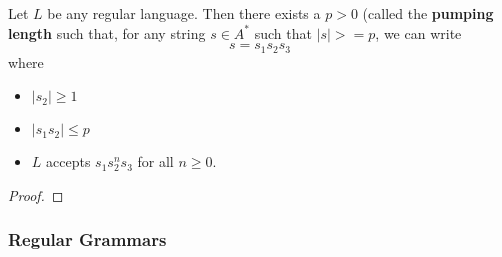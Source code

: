 \begin{theorem}
      Let \(L\) be any regular language. Then there exists a \(p>0\) (called the \textbf{pumping length} such that, for any string \(s\in A^*\) such that \(|s|>=p\), we can write \[s=s_1s_2s_3\] where 
      \begin{itemize}
            \item \(|s_2|\geq 1\)
            \item \(|s_1s_2|\leq p\)
            \item \(L\) accepts \(s_1s_2^ns_3\) for all \(n\geq0\).
      \end{itemize}
\end{theorem}

\begin{proof}

\end{proof}

\subsubsection{Regular Grammars}